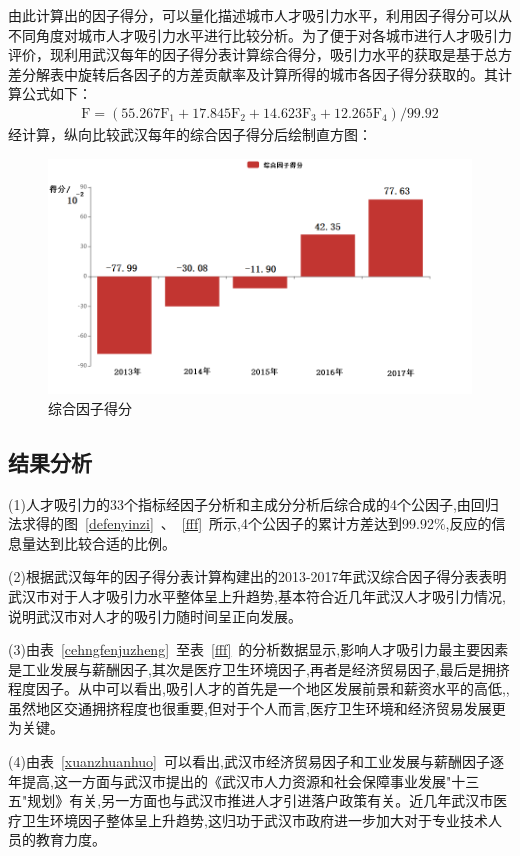\documentclass{whutmod}
\begin{document}
	由此计算出的因子得分，可以量化描述城市人才吸引力水平，利用因子得分可以从不同角度对城市人才吸引力水平进行比较分析。为了便于对各城市进行人才吸引力评价，现利用武汉每年的因子得分表计算综合得分，吸引力水平的获取是基于总方差分解表中旋转后各因子的方差贡献率及计算所得的城市各因子得分获取的。其计算公式如下：
	\begin{gather}
	\mathrm { F } = \left( 55.267 \mathrm { F } _ { 1 } + 17.845 \mathrm { F } _ { 2 } + 14.623 \mathrm { F } _ { 3 } + 12.265 \mathrm { F } _ { 4 } \right) / 99.92
	\end{gather}
	经计算，纵向比较武汉每年的综合因子得分后绘制直方图：
		\begin{figure}[H]
		\centering
		\includegraphics[width=\textwidth]{figures/wuhan.png}
		\caption{综合因子得分}
	\end{figure} 
	\subsection{结果分析}

	(1)人才吸引力的33个指标经因子分析和主成分分析后综合成的4个公因子,由回归法求得的图~\ref{defenyinzi}~、~\ref{fff}~所示,4个公因子的累计方差达到99.92\%,反应的信息量达到比较合适的比例。
	
	(2)根据武汉每年的因子得分表计算构建出的2013-2017年武汉综合因子得分表表明武汉市对于人才吸引力水平整体呈上升趋势,基本符合近几年武汉人才吸引力情况,说明武汉市对人才的吸引力随时间呈正向发展。
	
	(3)由表~\ref{cehngfenjuzheng}~至表~\ref{fff}~的分析数据显示,影响人才吸引力最主要因素是工业发展与薪酬因子,其次是医疗卫生环境因子,再者是经济贸易因子,最后是拥挤程度因子。从中可以看出,吸引人才的首先是一个地区发展前景和薪资水平的高低,,虽然地区交通拥挤程度也很重要,但对于个人而言,医疗卫生环境和经济贸易发展更为关键。
	
	(4)由表~\ref{xuanzhuanhuo}~可以看出,武汉市经济贸易因子和工业发展与薪酬因子逐年提高,这一方面与武汉市提出的《武汉市人力资源和社会保障事业发展"十三五"规划》有关,另一方面也与武汉市推进人才引进落户政策有关。近几年武汉市医疗卫生环境因子整体呈上升趋势,这归功于武汉市政府进一步加大对于专业技术人员的教育力度。
	
\end{document}
